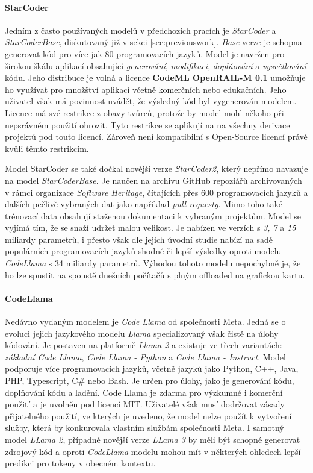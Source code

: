 \documentclass[czech, ma, kiv, he, iso690numb, pdf, viewonly]{fasthesis}
\begin{document}
    \paragraph{StarCoder} Jedním z často používaných modelů v předchozích pracích \cite{schafer2023empirical} je \textit{StarCoder} a \textit{StarCoderBase}, diskutovaný již v sekci \ref{sec:previouswork}. \textit{Base} verze je schopna generovat kód pro více jak 80 programovacích jazyků. Model je navržen pro širokou škálu aplikací obsahující \textit{generování}, \textit{modifikaci}, \textit{doplňování} a \textit{vysvětlování} kódu. Jeho distribuce je volná a licence \textbf{CodeML OpenRAIL-M 0.1} \cite{BigCode2023} umožňuje ho využívat pro množštví aplikací včetně komerčních nebo edukačních. Jeho uživatel však má povinnost uvádět, že výsledný kód byl vygenerován modelem. Licence má své restrikce z obavy tvůrců, protože by model mohl někoho při nepsrávném použití ohrozit. Tyto restrikce se aplikují na na všechny derivace projektů pod touto licencí. Zároveň není kompatibilní s Open-Source licencí právě kvůli těmto restrikcím.

    Model StarCoder se také dočkal novější verze \textit{StarCoder2}, který nepřímo navazuje na model \textit{StarCoderBase}. Je naučen na archivu GitHub repoziářů archivovaných v rámci organizace \textit{Software Heritage}, čítajících přes 600 programovacích jazyků a dalších pečlivě vybraných dat jako například \textit{pull requesty}. Mimo toho také trénovací data obsahují staženou dokumentaci k vybraným projektům. Model se vyjímá tím, že se snaží udržet malou velikost. Je nabízen ve verzích s \textit{3, 7} a \textit{15} miliardy parametrů, i přesto však dle jejich úvodní studie \cite{lozhkov2024starcoder} nabízí na sadě populárních programovacích jazyků shodné či lepší výsledky oproti modelu \textit{CodeLlama} s 34 miliardy parametrů. Výhodou tohoto modelu nepochybně je, že ho lze spustit na spoustě dnešních počítačů s plným offloaded na grafickou kartu.

    \paragraph{CodeLlama} Nedávno vydaným modelem je \textit{Code Llama} od společnosti Meta. Jedná se o evoluci jejich jazykového modelu \textit{Llama} specializovaný však čistě na úlohy kódování. Je postaven na platformě \textit{Llama 2} a existuje ve třech variantách: \textit{základní Code Llama}, \textit{Code Llama - Python} a \textit{Code Llama - Instruct}. Model podporuje více programovacích jazyků, včetně jazyků jako Python, C++, Java, PHP, Typescript, C# nebo Bash. Je určen pro úlohy, jako je generování kódu, doplňování kódu a ladění. Code Llama je zdarma pro výzkumné i komerční použití a je uvolněn pod licencí MIT. Uživatelé však musí dodržovat  zásady přijatelného použití, ve kterých je uvedeno, že model nelze použít k vytvoření služby, která by konkurovala vlastním službám společnosti Meta. \cite{roziere2024code} I samotný model \textit{LLama 2}, případně novější verze \textit{LLama 3} by měli být schopné generovat zdrojový kód a oproti \textit{CodeLlama} modelu mohou mít v některých ohledech lepší predikci pro tokeny v obecném kontextu. \cite{metallama3introduction}
\end{document}
